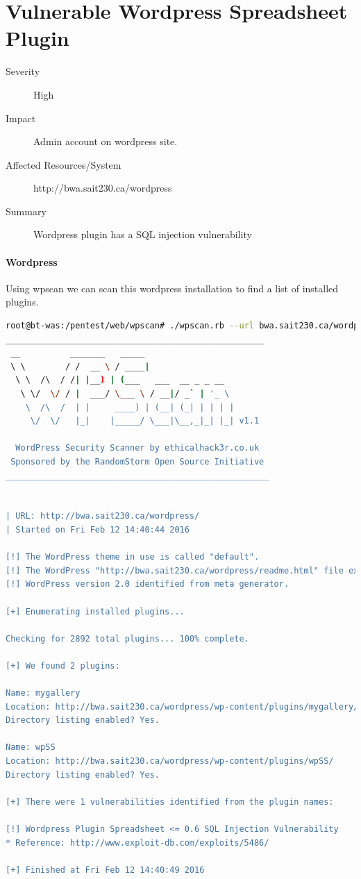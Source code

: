 \documentclass{article}
\begin{document}
\newpage
\section{Vulnerable Wordpress Spreadsheet Plugin}
\begin{description}
  \item[Severity] High
  \item[Impact] Admin account on wordpress site.
  \item[Affected Resources/System] http://bwa.sait230.ca/wordpress
  \item[Summary] Wordpress plugin has a SQL injection vulnerability
\end{description}

\paragraph{Wordpress}

Using wpscan we can scan this wordpress installation to find a list of installed plugins.

\begin{lstlisting}[language=Bash, firstline=26, lastline=39]
root@bt-was:/pentest/web/wpscan# ./wpscan.rb --url bwa.sait230.ca/wordpress --enumerate p
____________________________________________________
 __          _______   _____                  
 \ \        / /  __ \ / ____|                 
  \ \  /\  / /| |__) | (___   ___  __ _ _ __  
   \ \/  \/ / |  ___/ \___ \ / __|/ _` | '_ \ 
    \  /\  /  | |     ____) | (__| (_| | | | |
     \/  \/   |_|    |_____/ \___|\__,_|_| |_| v1.1

  WordPress Security Scanner by ethicalhack3r.co.uk
 Sponsored by the RandomStorm Open Source Initiative
_____________________________________________________


| URL: http://bwa.sait230.ca/wordpress/
| Started on Fri Feb 12 14:40:44 2016

[!] The WordPress theme in use is called "default".
[!] The WordPress "http://bwa.sait230.ca/wordpress/readme.html" file exists.
[!] WordPress version 2.0 identified from meta generator.

[+] Enumerating installed plugins...

Checking for 2892 total plugins... 100% complete.

[+] We found 2 plugins:

Name: mygallery
Location: http://bwa.sait230.ca/wordpress/wp-content/plugins/mygallery/
Directory listing enabled? Yes.

Name: wpSS
Location: http://bwa.sait230.ca/wordpress/wp-content/plugins/wpSS/
Directory listing enabled? Yes.

[+] There were 1 vulnerabilities identified from the plugin names:

[!] Wordpress Plugin Spreadsheet <= 0.6 SQL Injection Vulnerability
* Reference: http://www.exploit-db.com/exploits/5486/

[+] Finished at Fri Feb 12 14:40:49 2016
\end{lstlisting}
\end{document}

